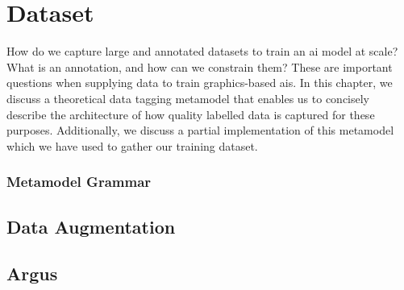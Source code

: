 \chapter{Dataset}
\label{ch:dataset}

How do we capture large and annotated datasets to train an \gls{ai} model at scale? What is an annotation, and how can we constrain them? These are important questions when supplying data to train graphics-based \glspl{ai}. In this chapter, we discuss a theoretical data tagging metamodel that enables us to concisely describe the architecture of how quality labelled data is captured for these purposes. Additionally, we discuss a partial implementation of this metamodel which we have used to gather our training dataset.




\subsection{Metamodel Grammar}


\section{Data Augmentation}

\section{Argus}

